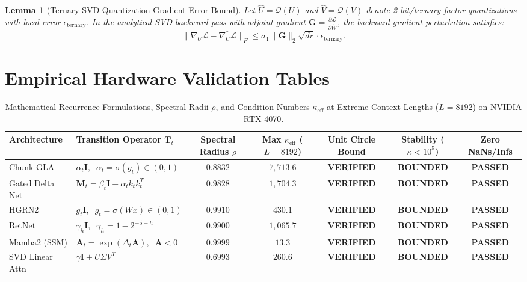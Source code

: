 \documentclass[10pt,journal,compsoc]{IEEEtran}
\newtheorem{lemma}{Lemma}
\begin{document}
\begin{lemma}[Ternary SVD Quantization Gradient Error Bound]
Let $\hat{U} = \mathcal{Q}(U)$ and $\hat{V} = \mathcal{Q}(V)$ denote 2-bit/ternary factor quantizations with local error $\epsilon_{\text{ternary}}$. In the analytical SVD backward pass with adjoint gradient $\mathbf{G} = \frac{\partial \mathcal{L}}{\partial \hat{W}}$, the backward gradient perturbation satisfies:
\begin{equation}
\|\nabla_U \mathcal{L} - \nabla_U^* \mathcal{L}\|_F \le \sigma_1 \|\mathbf{G}\|_2 \sqrt{d r} \cdot \epsilon_{\text{ternary}}.
\end{equation}
\end{lemma}

\section{Empirical Hardware Validation Tables}

\begin{table}[t]
\centering
\caption{Mathematical Recurrence Formulations, Spectral Radii $\rho$, and Condition Numbers $\kappa_{\text{eff}}$ at Extreme Context Lengths ($L=8192$) on NVIDIA RTX 4070.}
\label{tab:recurrence_audit}
\begin{tabular}{llccccc}
\toprule
\textbf{Architecture} & \textbf{Transition Operator} $\mathbf{T}_t$ & \textbf{Spectral Radius} $\rho$ & \textbf{Max} $\kappa_{\text{eff}}$ ($L=8192$) & \textbf{Unit Circle Bound} & \textbf{Stability ($\kappa < 10^5$)} & \textbf{Zero NaNs/Infs} \\
\midrule
Chunk GLA & $\alpha_t \mathbf{I}, \;\; \alpha_t = \sigma(g_t) \in (0, 1)$ & $0.8832$ & $7,713.6$ & \textbf{VERIFIED} & \textbf{BOUNDED} & \textbf{PASSED} \\
Gated Delta Net & $\mathbf{M}_t = \beta_t \mathbf{I} - \alpha_t k_t k_t^T$ & $0.9828$ & $1,704.3$ & \textbf{VERIFIED} & \textbf{BOUNDED} & \textbf{PASSED} \\
HGRN2 & $g_t \mathbf{I}, \;\; g_t = \sigma(W x) \in (0, 1)$ & $0.9910$ & $430.1$ & \textbf{VERIFIED} & \textbf{BOUNDED} & \textbf{PASSED} \\
RetNet & $\gamma_h \mathbf{I}, \;\; \gamma_h = 1 - 2^{-5-h}$ & $0.9900$ & $1,065.7$ & \textbf{VERIFIED} & \textbf{BOUNDED} & \textbf{PASSED} \\
Mamba2 (SSM) & $\bar{\mathbf{A}}_t = \exp(\Delta_t \mathbf{A}), \;\; \mathbf{A} < 0$ & $0.9999$ & $13.3$ & \textbf{VERIFIED} & \textbf{BOUNDED} & \textbf{PASSED} \\
SVD Linear Attn & $\gamma \mathbf{I} + U \Sigma V^T$ & $0.6993$ & $260.6$ & \textbf{VERIFIED} & \textbf{BOUNDED} & \textbf{PASSED} \\
\bottomrule
\end{tabular}
\end{table}
\end{document}
